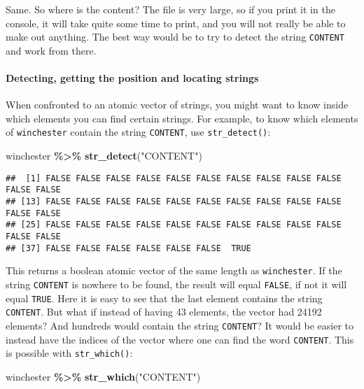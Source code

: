 \documentclass[
]{article}
\newenvironment{Shaded}{\begin{snugshade}}{\end{snugshade}}
\newcommand{\KeywordTok}[1]{\textcolor[rgb]{0.13,0.29,0.53}{\textbf{#1}}}
\newcommand{\NormalTok}[1]{#1}
\newcommand{\OperatorTok}[1]{\textcolor[rgb]{0.81,0.36,0.00}{\textbf{#1}}}
\newcommand{\StringTok}[1]{\textcolor[rgb]{0.31,0.60,0.02}{#1}}
\begin{document}
\begin{verbatim}
\end{verbatim}

Same. So where is the content? The file is very large, so if you print it in the console, it will
take quite some time to print, and you will not really be able to make out anything. The best
way would be to try to detect the string \texttt{CONTENT} and work from there.

\hypertarget{detecting-getting-the-position-and-locating-strings}{%
\paragraph{Detecting, getting the position and locating strings}\label{detecting-getting-the-position-and-locating-strings}}

When confronted to an atomic vector of strings, you might want to know inside which elements you
can find certain strings. For example, to know which elements of \texttt{winchester} contain the string
\texttt{CONTENT}, use \texttt{str\_detect()}:

\begin{Shaded}
\begin{Highlighting}[]
\NormalTok{winchester }\OperatorTok{\%\textgreater{}\%}
\StringTok{  }\KeywordTok{str\_detect}\NormalTok{(}\StringTok{"CONTENT"}\NormalTok{)}
\end{Highlighting}
\end{Shaded}

\begin{verbatim}
##  [1] FALSE FALSE FALSE FALSE FALSE FALSE FALSE FALSE FALSE FALSE FALSE FALSE
## [13] FALSE FALSE FALSE FALSE FALSE FALSE FALSE FALSE FALSE FALSE FALSE FALSE
## [25] FALSE FALSE FALSE FALSE FALSE FALSE FALSE FALSE FALSE FALSE FALSE FALSE
## [37] FALSE FALSE FALSE FALSE FALSE FALSE  TRUE
\end{verbatim}

This returns a boolean atomic vector of the same length as \texttt{winchester}. If the string \texttt{CONTENT} is
nowhere to be found, the result will equal \texttt{FALSE}, if not it will equal \texttt{TRUE}. Here it is easy to
see that the last element contains the string \texttt{CONTENT}. But what if instead of having 43 elements,
the vector had 24192 elements? And hundreds would contain the string \texttt{CONTENT}? It would be easier
to instead have the indices of the vector where one can find the word \texttt{CONTENT}. This is possible
with \texttt{str\_which()}:

\begin{Shaded}
\begin{Highlighting}[]
\NormalTok{winchester }\OperatorTok{\%\textgreater{}\%}
\StringTok{  }\KeywordTok{str\_which}\NormalTok{(}\StringTok{"CONTENT"}\NormalTok{)}
\end{Highlighting}
\end{Shaded}
\end{document}
